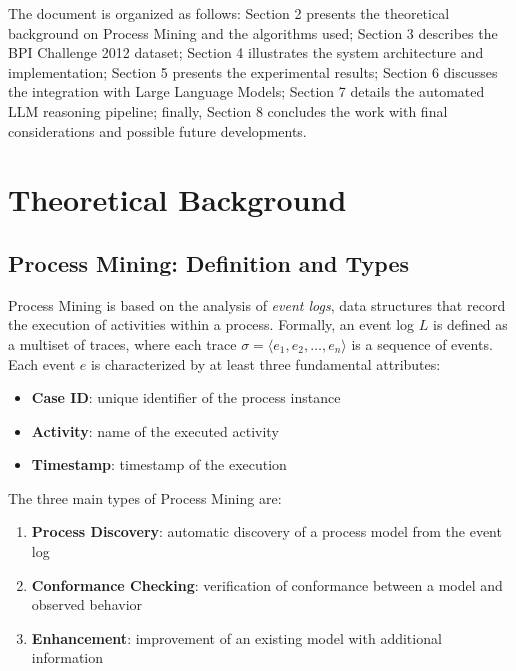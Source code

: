 \documentclass[a4paper,twoside,12pt]{article}
\begin{document}
The document is organized as follows: Section 2 presents the theoretical background on Process Mining and the algorithms used; Section 3 describes the BPI Challenge 2012 dataset; Section 4 illustrates the system architecture and implementation; Section 5 presents the experimental results; Section 6 discusses the integration with Large Language Models; Section 7 details the automated LLM reasoning pipeline; finally, Section 8 concludes the work with final considerations and possible future developments.

\section{Theoretical Background}

\subsection{Process Mining: Definition and Types}

Process Mining is based on the analysis of \textit{event logs}, data structures that record the execution of activities within a process. Formally, an event log $L$ is defined as a multiset of traces, where each trace $\sigma = \langle e_1, e_2, \ldots, e_n \rangle$ is a sequence of events. Each event $e$ is characterized by at least three fundamental attributes:

\begin{itemize}
    \item \textbf{Case ID}: unique identifier of the process instance
    \item \textbf{Activity}: name of the executed activity
    \item \textbf{Timestamp}: timestamp of the execution
\end{itemize}

The three main types of Process Mining are:

\begin{enumerate}
    \item \textbf{Process Discovery}: automatic discovery of a process model from the event log
    \item \textbf{Conformance Checking}: verification of conformance between a model and observed behavior
    \item \textbf{Enhancement}: improvement of an existing model with additional information
\end{enumerate}
\end{document}

